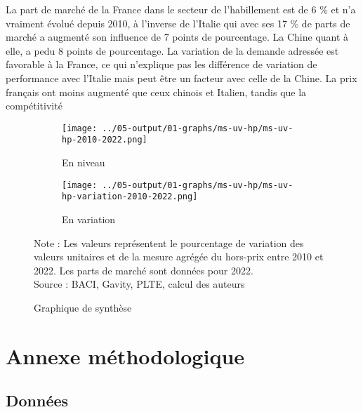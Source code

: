 \documentclass[french,10pt,a4paper]{article}
\begin{document}
La part de marché de la France dans le secteur de l'habillement est de 6 \% et n'a vraiment évolué depuis 2010, à l'inverse de l'Italie qui avec ses 17 \% de parts de marché a augmenté son influence de 7 points de pourcentage. La Chine quant à elle, a pedu 8 points de pourcentage. La variation de la demande adressée est favorable à la France, ce qui n'explique pas les différence de variation de performance avec l'Italie mais peut être un facteur avec celle de la Chine. La prix français ont moins augmenté que ceux chinois et Italien, tandis que la compétitivité 





\begin{figure}[!h]
  \centering
  \begin{subfigure}{\textwidth}
    \centering    \texttt{[image: ../05-output/01-graphs/ms-uv-hp/ms-uv-hp-2010-2022.png]}
    \caption{En niveau}
    \label{fig:ms-uv-hp}
  \end{subfigure}
  \vspace{0.5cm}
  \begin{subfigure}{\textwidth}
    \centering \texttt{[image: ../05-output/01-graphs/ms-uv-hp/ms-uv-hp-variation-2010-2022.png]}
 \caption{En variation}
 \label{fig:ms-uv-hp-variation}
  \end{subfigure}
  \captionsetup{justification=justified, singlelinecheck=false, font=small}
  \caption*{Note : Les valeurs représentent le pourcentage de variation des valeurs unitaires et de la mesure agrégée du hors-prix entre 2010 et 2022. Les parts de marché sont données pour 2022.\\
  Source : BACI, Gavity, PLTE, calcul des auteurs}
  \captionsetup{justification=centering, singlelinecheck=true, font=normalsize}
  \caption{Graphique de synthèse}
  \label{fig:graph-synthese}
\end{figure}


\newpage

\section{Annexe méthodologique}
\subsection{Données}
\end{document}
